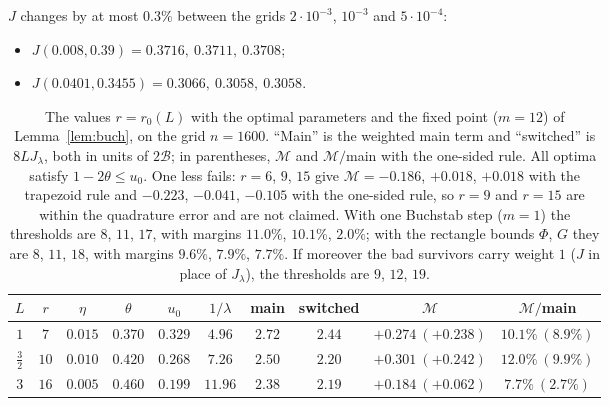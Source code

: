 \documentclass[11pt]{amsart}
\theoremstyle{remark}
\begin{document}
$J$ changes by at most $0.3\%$ between the grids $2\cdot10^{-3}$, $10^{-3}$ and $5\cdot10^{-4}$:
\begin{itemize}[leftmargin=1.5em]
\item $J(0.008,0.39)=0.3716,\ 0.3711,\ 0.3708$;
\item $J(0.0401,0.3455)=0.3066,\ 0.3058,\ 0.3058$.
\end{itemize}

\begin{table}[htbp]
\centering
\begin{tabular}{cccccccccc}
\toprule
$L$ & $r$ & $\eta$ & $\theta$ & $u_0$ & $1/\lambda$ & main & switched & $\mathcal M$ & $\mathcal M/$main\\
\midrule
$1$ & $7$ & $0.015$ & $0.370$ & $0.329$ & $4.96$ & $2.72$ & $2.44$ & $+0.274\ (+0.238)$ & $10.1\%\ (8.9\%)$\\
$\frac32$ & $10$ & $0.010$ & $0.420$ & $0.268$ & $7.26$ & $2.50$ & $2.20$ & $+0.301\ (+0.242)$ & $12.0\%\ (9.9\%)$\\
$3$ & $16$ & $0.005$ & $0.460$ & $0.199$ & $11.96$ & $2.38$ & $2.19$ & $+0.184\ (+0.062)$ & $7.7\%\ (2.7\%)$\\
\bottomrule
\end{tabular}
\caption{The values $r=r_0(L)$ with the optimal parameters and the fixed point ($m=12$) of Lemma~\ref{lem:buch}, on the grid $n=1600$. ``Main'' is the weighted main term and ``switched'' is $8LJ_\lambda$, both in units of $2\mathcal B$; in parentheses, $\mathcal M$ and $\mathcal M/$main with the one-sided rule. All optima satisfy $1-2\theta\le u_0$. One less fails: $r=6$, $9$, $15$ give $\mathcal M=-0.186$, $+0.018$, $+0.018$ with the trapezoid rule and $-0.223$, $-0.041$, $-0.105$ with the one-sided rule, so $r=9$ and $r=15$ are within the quadrature error and are not claimed. With one Buchstab step ($m=1$) the thresholds are $8$, $11$, $17$, with margins $11.0\%$, $10.1\%$, $2.0\%$; with the rectangle bounds $\Phi$, $G$ they are $8$, $11$, $18$, with margins $9.6\%$, $7.9\%$, $7.7\%$. If moreover the bad survivors carry weight $1$ ($J$ in place of $J_\lambda$), the thresholds are $9$, $12$, $19$.}
\label{tab:r0}
\end{table}
\end{document}

